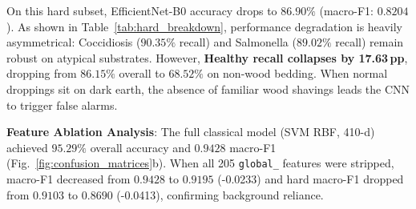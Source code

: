 \documentclass[conference]{IEEEtran}
\begin{document}
\begin{table}[htbp]
\caption{Diagnostic Recall Breakdown: General Test ($N=1{,}209$) vs.\ Hard Subsets ($n=374$)}
\centering\footnotesize
{}
\label{tab:hard_breakdown}
\end{table}

On this hard subset, EfficientNet-B0 accuracy drops to $86.90\%$ (macro-F1: $0.8204$). As shown in Table~\ref{tab:hard_breakdown}, performance degradation is heavily asymmetrical: Coccidiosis ($90.35\%$ recall) and Salmonella ($89.02\%$ recall) remain robust on atypical substrates. However, \textbf{Healthy recall collapses by 17.63\,pp}, dropping from $86.15\%$ overall to $68.52\%$ on non-wood bedding. When normal droppings sit on dark earth, the absence of familiar wood shavings leads the CNN to trigger false alarms.

\textbf{Feature Ablation Analysis}: The full classical model (SVM RBF, 410-d) achieved $95.29\%$ overall accuracy and $0.9428$ macro-F1 (Fig.~\ref{fig:confusion_matrices}b). When all 205 \texttt{global\_} features were stripped, macro-F1 decreased from $0.9428$ to $0.9195$ (-0.0233) and hard macro-F1 dropped from $0.9103$ to $0.8690$ (-0.0413), confirming background reliance.
\end{document}
